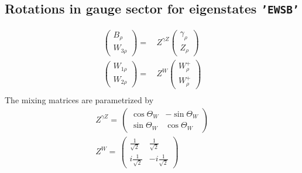 \subsection{Rotations in gauge sector for eigenstates {\tt 'EWSB'} } 
\begin{align} 
\left(\begin{array}{c} 
B_{{\rho}}\\ 
W_{{3 \rho}}\end{array} \right) 
 = & \,Z^{\gamma Z}
\left(\begin{array}{c} 
\gamma_{{\rho}}\\ 
Z_{{\rho}}\end{array} \right) \\ 
\left(\begin{array}{c} 
W_{{1 \rho}}\\ 
W_{{2 \rho}}\end{array} \right) 
 = & \,Z^{W}
\left(\begin{array}{c} 
W^+_{{\rho}}\\ 
W^+_{{\rho}}\end{array} \right) \\ 
\end{align} 
The mixing matrices are parametrized by \\ 
\begin{align} 
Z^{\gamma Z}= \, \left( 
\begin{array}{cc} 
\cos\Theta_W  & - \sin\Theta_W   \\ 
 \sin\Theta_W  & \cos\Theta_W \end{array} 
\right) \\ 
Z^{W}= \, \left( 
\begin{array}{cc} 
\frac{1}{\sqrt{2}} & \frac{1}{\sqrt{2}} \\ 
 i \frac{1}{\sqrt{2}}  & -i \frac{1}{\sqrt{2}} \end{array} 
\right) \\ 
\end{align} 
